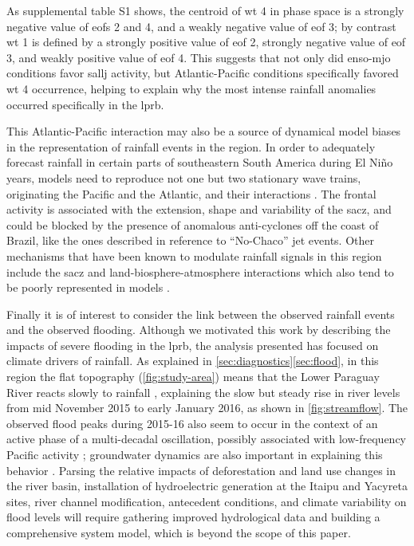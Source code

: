 \documentclass[twocol]{ametsoc}
\begin{document}
As supplemental table S1 shows, the centroid of \gls{wt} 4 in phase space is a strongly negative value of \glspl{eof} 2 and 4, and a weakly negative value of \gls{eof} 3; by contrast \gls{wt} 1 is defined by a strongly positive value of \gls{eof} 2, strongly negative value of \gls{eof} 3, and weakly positive value of \gls{eof} 4.
This suggests that not only did \gls{enso}-\gls{mjo} conditions favor \gls{sallj} activity, but Atlantic-Pacific conditions specifically favored  \gls{wt} 4 occurrence, helping to explain why the most intense rainfall anomalies occurred specifically in the \gls{lprb}.

This Atlantic-Pacific interaction may also be a source of dynamical model biases in the representation of rainfall events in the region.
In order to adequately forecast rainfall in certain parts of southeastern South America during El Ni\~no years, models need to reproduce not one but two stationary wave trains, originating the Pacific and the Atlantic, and their interactions \citep{Barreiro2017}.
The frontal activity is associated with the extension, shape and variability of the \gls{sacz}, and could be blocked by the presence of anomalous anti-cyclones off the coast of Brazil, like the ones described in reference to ``No-Chaco'' jet events.
Other mechanisms that have been known to modulate rainfall signals in this region include the \gls{sacz} \citep{Carvalho2004,Munoz2015,Munoz2016} and land-biosphere-atmosphere interactions \citep{Grimm2000,Grimm2007} which also tend to be poorly represented in models \citep{Koster2004,Green2017}.

Finally it is of interest to consider the link between the observed rainfall events and the observed flooding.
Although we motivated this work by describing the impacts of severe flooding in the \gls{lprb}, the analysis presented has focused on climate drivers of rainfall.
As explained in \cref{sec:diagnostics}\ref{sec:flood}, in this region the flat topography (\cref{fig:study-area}) means that the Lower Paraguay River reacts slowly to rainfall \citep{Bravo2011,Barros2004}, explaining the slow but steady rise in river levels from mid November 2015 to early January 2016, as shown in \cref{fig:streamflow}.
The observed flood peaks during 2015-16 also seem to occur in the context of an active phase of a multi-decadal oscillation, possibly associated with low-frequency Pacific activity \citep{Collischonn2001,Huang2005}; groundwater dynamics are also important in explaining this behavior \citep{Santos2016}.
Parsing the relative impacts of deforestation and land use changes in the river basin, installation of hydroelectric generation at the Itaipu and Yacyreta sites, river channel modification, antecedent conditions, and climate variability on flood levels will require gathering improved hydrological data and building a comprehensive system model, which is beyond the scope of this paper.
\end{document}
